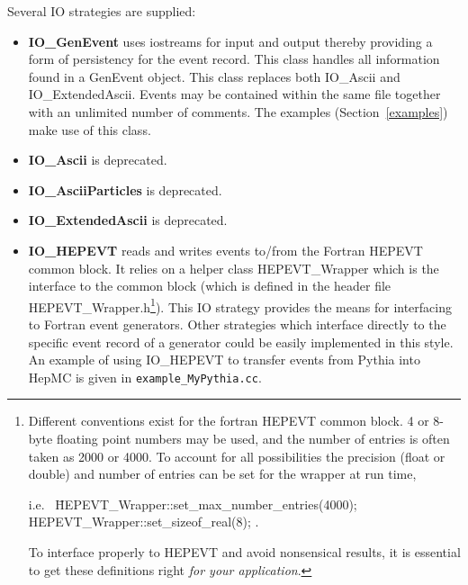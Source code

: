 \documentclass[11pt,letterpaper]{article}
\begin{document}
Several IO strategies are supplied:
\begin{itemize}\setlength{\itemsep}{0pt}
  \item {\bf IO\_GenEvent} uses iostreams for input and output
    thereby providing a form of persistency for the event record. 
    This class handles all information found in a GenEvent object.
    This class replaces both IO\_Ascii and IO\_ExtendedAscii.
    Events may be contained within the same file together with
    an unlimited number of comments. 
    The examples (Section~\ref{examples}) make use of this class.
  \item {\bf IO\_Ascii} is deprecated.
  \item {\bf IO\_AsciiParticles}  is deprecated.
  \item {\bf IO\_ExtendedAscii} is deprecated.
  \item {\bf IO\_HEPEVT} reads and writes events to/from the Fortran HEPEVT
    common block. It relies on a helper class HEPEVT\_Wrapper which
    is the interface to the common block
    (which is defined in the header file HEPEVT\_Wrapper.h\footnote{
      Different conventions exist for the fortran HEPEVT common
      block. 4 or 8-byte floating point numbers may be used, and the
      number of entries is often taken as 2000 or 4000. To account for
      all possibilities the precision (float or double) and number of
      entries can be set for the wrapper at run time,
      \begin{tabbing}
      i.e.\ \hspace{1cm} \= HEPEVT\_Wrapper::set\_max\_number\_entries(4000);\\
                         \> HEPEVT\_Wrapper::set\_sizeof\_real(8); 
            \hspace{1cm} .
      \end{tabbing}
      To interface properly to HEPEVT and avoid nonsensical
      results, it is essential to get these definitions right
      {\it for your application}. 
      }).
    This IO strategy
    provides the means for interfacing to Fortran event
    generators. Other strategies which interface directly to the
    specific event record of a generator could be easily implemented
    in this style. An example of using IO\_HEPEVT to transfer events
    from Pythia into HepMC is given in \verb!example_MyPythia.cc!.
\end{itemize}


%
%
\end{document}
